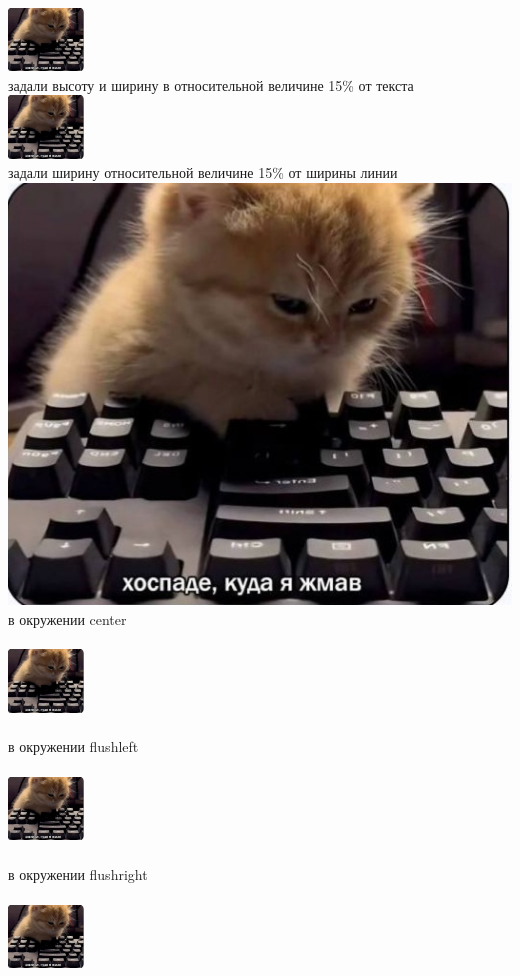 \documentclass{article}
\begin{document}
\includegraphics[width=0.15\textwidth]{mem}  
\\
задали высоту и ширину в относительной величине 15\% от текста \\
\includegraphics[height=0.15\textheight, width=0.15\textwidth]{mem} 
\\
задали ширину относительной величине 15\% от ширины линии \\
\includegraphics[width=0.15\linewidth]{mem} 
\newpage
в окружении center \\
\begin{center}
\includegraphics[height=2cm, width=2cm]{mem} 
\end{center}

в окружении flushleft \\
\begin{flushleft}
\includegraphics[height=2cm, width=2cm]{mem} 
\end{flushleft}

в окружении flushright \\
\begin{flushright}
\includegraphics[height=2cm, width=2cm]{mem} 
\end{flushright}
\newpage
\end{document}
